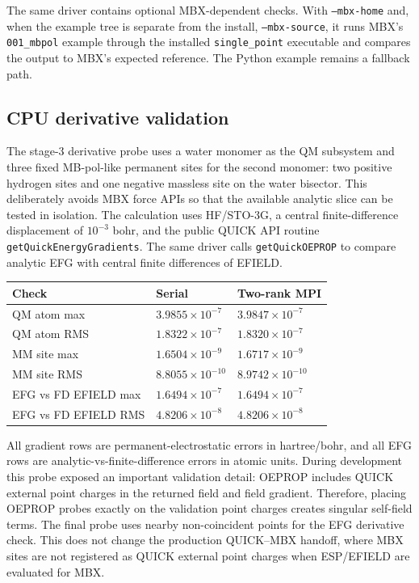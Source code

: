 \documentclass[11pt]{article}
\begin{document}
The same driver contains optional MBX-dependent checks. With
\texttt{--mbx-home} and, when the example tree is separate from the install,
\texttt{--mbx-source}, it runs MBX's \texttt{001\_mbpol} example through the
installed \texttt{single\_point} executable and compares the output to MBX's
expected reference. The Python example remains a fallback path.

\subsection{CPU derivative validation}

The stage-3 derivative probe uses a water monomer as the QM subsystem and
three fixed MB-pol-like permanent sites for the second monomer: two
positive hydrogen sites and one negative massless site on the water
bisector. This deliberately avoids MBX force APIs so that the available
analytic slice can be tested in isolation. The calculation uses
HF/STO-3G, a central finite-difference displacement of $10^{-3}$ bohr, and
the public QUICK API routine \texttt{getQuickEnergyGradients}. The same
driver calls \texttt{getQuickOEPROP} to compare analytic EFG with central
finite differences of EFIELD.

\begin{center}
\small
\begin{tabular}{lll}
\toprule
Check & Serial & Two-rank MPI \\
\midrule
QM atom max &
$3.9855\times10^{-7}$ & $3.9847\times10^{-7}$ \\
QM atom RMS &
$1.8322\times10^{-7}$ & $1.8320\times10^{-7}$ \\
MM site max &
$1.6504\times10^{-9}$ & $1.6717\times10^{-9}$ \\
MM site RMS &
$8.8055\times10^{-10}$ & $8.9742\times10^{-10}$ \\
EFG vs FD EFIELD max &
$1.6494\times10^{-7}$ & $1.6494\times10^{-7}$ \\
EFG vs FD EFIELD RMS &
$4.8206\times10^{-8}$ & $4.8206\times10^{-8}$ \\
\bottomrule
\end{tabular}
\end{center}

All gradient rows are permanent-electrostatic errors in hartree/bohr, and
all EFG rows are analytic-vs-finite-difference errors in atomic
units. During development this probe exposed an important validation
detail: OEPROP includes QUICK external point charges in the returned field
and field gradient. Therefore, placing OEPROP probes exactly on the
validation point charges creates singular self-field terms. The final
probe uses nearby non-coincident points for the EFG derivative check. This
does not change the production QUICK--MBX handoff, where MBX sites are not
registered as QUICK external point charges when ESP/EFIELD are evaluated
for MBX.
\end{document}
